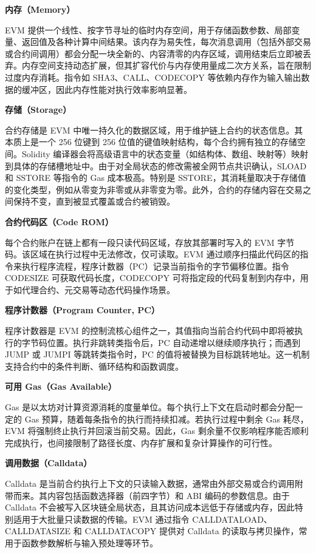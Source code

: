 \documentclass[print, master, vlined, timesmath]{DissertUESTC}
\begin{document}
\textbf{内存（Memory）}

EVM 提供一个线性、按字节寻址的临时内存空间，用于存储函数参数、局部变量、返回值及各种计算中间结果\cite{}。该内存为易失性，每次消息调用（包括外部交易或合约间调用）都会分配一块全新的、内容清零的内存区域，调用结束后立即被丢弃。内存空间支持动态扩展，但其扩容代价与内存使用量成二次方关系\cite{}，旨在限制过度内存消耗。指令如 SHA3、CALL、CODECOPY 等依赖内存作为输入输出数据的缓冲区，因此内存性能对执行效率影响显著。

\textbf{存储（Storage）}

合约存储是 EVM 中唯一持久化的数据区域，用于维护链上合约的状态信息\cite{}。其本质上是一个 256 位键到 256 位值的键值映射结构，每个合约拥有独立的存储空间。Solidity 编译器会将高级语言中的状态变量（如结构体、数组、映射等）映射到具体的存储槽地址中\cite{}。由于对全局状态的修改需被全网节点共识确认，SLOAD 和 SSTORE 等指令的 Gas 成本极高\cite{}。特别是 SSTORE，其消耗量取决于存储值的变化类型，例如从零变为非零或从非零变为零。此外，合约的存储内容在交易之间保持不变，直到被显式覆盖或合约被销毁。

\textbf{合约代码区（Code ROM）}

每个合约账户在链上都有一段只读代码区域，存放其部署时写入的 EVM 字节码\cite{}。该区域在执行过程中无法修改，仅可读取。EVM 通过顺序扫描此代码区的指令来执行程序流程，程序计数器（PC）记录当前指令的字节偏移位置。指令 CODESIZE 可获取代码长度，CODECOPY 可将指定段的代码复制到内存中，用于如代理合约\cite{}、元交易\cite{}等动态代码操作场景。

\textbf{程序计数器（Program Counter, PC）}

程序计数器是 EVM 的控制流核心组件之一，其值指向当前合约代码中即将被执行的字节码位置。执行非跳转类指令后，PC 自动递增以继续顺序执行；而遇到 JUMP 或 JUMPI 等跳转类指令时，PC 的值将被替换为目标跳转地址。这一机制支持合约中的条件判断、循环结构和函数调度。

\textbf{可用 Gas（Gas Available）}

Gas 是以太坊对计算资源消耗的度量单位\cite{}。每个执行上下文在启动时都会分配一定的 Gas 预算，随着每条指令的执行而持续扣减。若执行过程中剩余 Gas 耗尽，EVM 将强制终止执行并回滚当前交易。因此，Gas 剩余量不仅影响程序能否顺利完成执行，也间接限制了路径长度、内存扩展和复杂计算操作的可行性。

\textbf{调用数据（Calldata）}

Calldata 是当前合约执行上下文的只读输入数据，通常由外部交易或合约调用附带而来\cite{}。其内容包括函数选择器（前四字节）和 ABI 编码的参数信息\cite{}。由于 Calldata 不会被写入区块链全局状态，且其访问成本远低于存储或内存，因此特别适用于大批量只读数据的传输。EVM 通过指令 CALLDATALOAD、CALLDATASIZE 和 CALLDATACOPY 提供对 Calldata 的读取与拷贝操作，常用于函数参数解析与输入预处理等环节。
\end{document}
